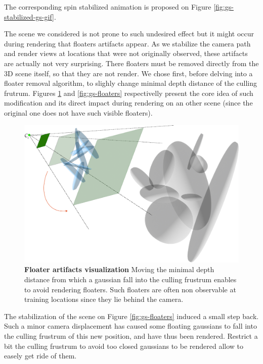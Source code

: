 The corresponding spin stabilized animation is proposed on Figure \ref{fig:gs-stabilized-gs-gif}. 

\begin{center}
  \label{fig:gs-stabilized-gs-gif}
\end{center}

The scene we considered is not prone to such undesired effect but it might occur during rendering that floaters artifacts appear. As we stabilize the camera path and render views at locations that were not originally observed, these artifacts are actually not very surprising. There floaters must be removed directly from the 3D scene itself, so that they are not render. We chose first, before delving into a floater removal algorithm, to slighly change minimal depth distance of the culling frutrum. Figures \ref{fig:gs-cullingfrustrum} and \ref{fig:gs-floaters} respectivelly present the core idea of such modification and its direct impact during rendering on an other scene (since the original one does not have such visible floaters). 


\begin{figure}[htb!]
  \center
\includegraphics[width=.7\linewidth]{images/gaussiansplatting/gaussian-floaters.png}
\caption{\textbf{Floater artifacts visualization} Moving the minimal depth distance from which a gaussian fall into the culling frustrum enables to avoid rendering floaters. Such floaters are often non observable at training locations since they lie behind the camera.}
\label{fig:gs-cullingfrustrum}
\end{figure}

The stabilization of the scene on Figure \ref{fig:gs-floaters} induced a small step back. Such a minor camera displacement has caused some floating gaussians to fall into the culling frustrum of this new position, and have thus been rendered. Restrict a bit the culling frustrum to avoid too closed gaussians to be rendered allow to easely get ride of them. 
 
